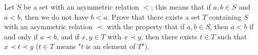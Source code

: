 Let $S$ be a set with an asymmetric relation $<$; this means that if $a, b \in
S$ and $a < b$, then we do not have $b < a$. Prove that there exists a set $T$
containing $S$ with an asymmetric relation $\prec$ with the property that if
$a, b \in S$, then $a < b$ if and only if $a \prec b$, and if $x, y \in T$ with
$x \prec y$, then there exists $t \in T$ such that $x \prec t \prec y$ ($t \in
T$ means "$t$ is an element of $T$").
